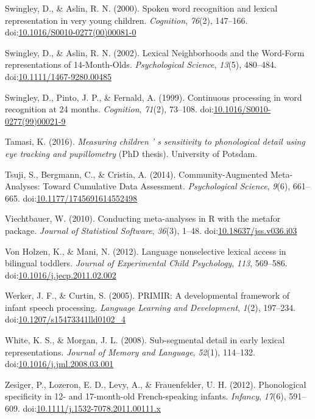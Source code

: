 \documentclass[man, noextraspace]{apa6}
\begin{document}
\leavevmode\hypertarget{ref-Swingley2000}{}%
Swingley, D., \& Aslin, R. N. (2000). Spoken word recognition and lexical representation in very young children. \emph{Cognition}, \emph{76}(2), 147--166. doi:\href{https://doi.org/10.1016/S0010-0277(00)00081-0}{10.1016/S0010-0277(00)00081-0}

\leavevmode\hypertarget{ref-Swingley2002}{}%
Swingley, D., \& Aslin, R. N. (2002). Lexical Neighborhoods and the Word-Form representations of 14-Month-Olds. \emph{Psychological Science}, \emph{13}(5), 480--484. doi:\href{https://doi.org/10.1111/1467-9280.00485}{10.1111/1467-9280.00485}

\leavevmode\hypertarget{ref-Swingley1999}{}%
Swingley, D., Pinto, J. P., \& Fernald, A. (1999). Continuous processing in word recognition at 24 months. \emph{Cognition}, \emph{71}(2), 73--108. doi:\href{https://doi.org/10.1016/S0010-0277(99)00021-9}{10.1016/S0010-0277(99)00021-9}

\leavevmode\hypertarget{ref-Tamasi2016}{}%
Tamasi, K. (2016). \emph{Measuring children ' s sensitivity to phonological detail using eye tracking and pupillometry} (PhD thesis). University of Potsdam.

\leavevmode\hypertarget{ref-Tsuji2014}{}%
Tsuji, S., Bergmann, C., \& Cristia, A. (2014). Community-Augmented Meta-Analyses: Toward Cumulative Data Assessment. \emph{Psychological Science}, \emph{9}(6), 661--665. doi:\href{https://doi.org/10.1177/1745691614552498}{10.1177/1745691614552498}

\leavevmode\hypertarget{ref-metafor}{}%
Viechtbauer, W. (2010). Conducting meta-analyses in R with the metafor package. \emph{Journal of Statistical Software}, \emph{36}(3), 1--48. doi:\href{https://doi.org/10.18637/jss.v036.i03}{10.18637/jss.v036.i03}

\leavevmode\hypertarget{ref-VonHolzen2012}{}%
Von Holzen, K., \& Mani, N. (2012). Language nonselective lexical access in bilingual toddlers. \emph{Journal of Experimental Child Psychology}, \emph{113}, 569--586. doi:\href{https://doi.org/10.1016/j.jecp.2011.02.002}{10.1016/j.jecp.2011.02.002}

\leavevmode\hypertarget{ref-Werker2005}{}%
Werker, J. F., \& Curtin, S. (2005). PRIMIR: A developmental framework of infant speech processing. \emph{Language Learning and Development}, \emph{1}(2), 197--234. doi:\href{https://doi.org/10.1207/s15473341lld0102_4}{10.1207/s15473341lld0102\_4}

\leavevmode\hypertarget{ref-White2008}{}%
White, K. S., \& Morgan, J. L. (2008). Sub-segmental detail in early lexical representations. \emph{Journal of Memory and Language}, \emph{52}(1), 114--132. doi:\href{https://doi.org/10.1016/j.jml.2008.03.001}{10.1016/j.jml.2008.03.001}

\leavevmode\hypertarget{ref-Zesiger2012}{}%
Zesiger, P., Lozeron, E. D., Levy, A., \& Frauenfelder, U. H. (2012). Phonological specificity in 12- and 17-month-old French-speaking infants. \emph{Infancy}, \emph{17}(6), 591--609. doi:\href{https://doi.org/10.1111/j.1532-7078.2011.00111.x}{10.1111/j.1532-7078.2011.00111.x}

\endgroup
\end{document}
